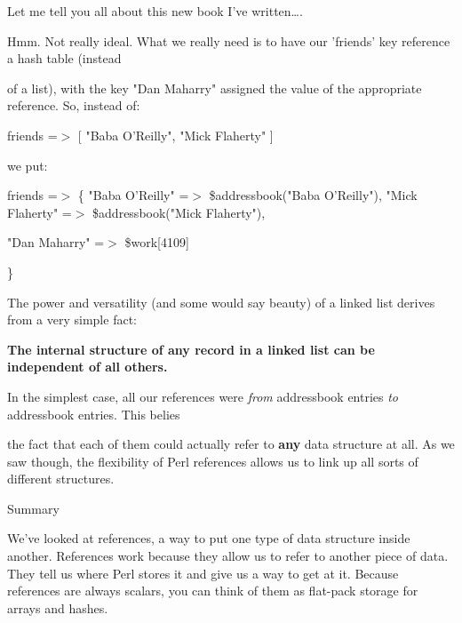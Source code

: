 \documentclass[a4paper,11pt]{book}
\begin{document}
\noindent Let me tell you all about this new book I've written\dots .

\noindent 

\noindent Hmm. Not really ideal. What we really need is to have our 'friends' key reference a hash table (instead

\noindent of a list), with the key "Dan Maharry" assigned the value of the appropriate reference. So, instead of:

\noindent 

\noindent friends =$>$ [ "Baba O'Reilly", "Mick Flaherty" ]

\noindent 

\noindent 

\noindent we put:

\noindent 

\noindent 

\noindent friends =$>$ \{ "Baba O'Reilly" =$>$ \$addressbook("Baba O'Reilly"), "Mick Flaherty" =$>$ \$addressbook("Mick Flaherty"),

\noindent "Dan Maharry" =$>$ \$work[4109]

\noindent \}

\noindent 

\noindent The power and versatility (and some would say beauty) of a linked list derives from a very simple fact:

\noindent 

\noindent 

\noindent \textbf{The internal structure of any record in a linked list can be independent of all others.}

\noindent 

\noindent 

\noindent In the simplest case, all our references were \textit{from }addressbook entries \textit{to }addressbook entries. This belies

\noindent the fact that each of them could actually refer to \textbf{any }data structure at all. As we saw though, the flexibility of Perl references allows us to link up all sorts of different structures.

\noindent 

\noindent 

\noindent Summary

\noindent 

\noindent We've looked at references, a way to put one type of data structure inside another. References work because they allow us to refer to another piece of data. They tell us where Perl stores it and give us a way to get at it. Because references are always scalars, you can think of them as flat-pack storage for arrays and hashes.
\end{document}
